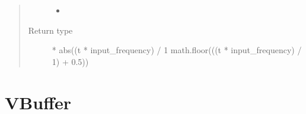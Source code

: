 \documentclass[letterpaper,10pt,english]{sphinxmanual}
\begin{document}
\begin{fulllineitems}
\begin{fulllineitems}
\begin{quote}
\begin{description}
\begin{itemize}
\item {} 
\sphinxAtStartPar
{} \textendash{} 

\end{itemize}

\item[{Return type}] \leavevmode
{} * abs((t * input\_frequency) / 1 \sphinxhyphen{} math.floor(((t * input\_frequency) / 1) + 0.5))

\end{description}\end{quote}

\end{fulllineitems}


\end{fulllineitems}


\sphinxstepscope


\section{VBuffer}
\label{\detokenize{vbuffer:module-vbuffer}}\label{\detokenize{vbuffer:vbuffer}}\label{\detokenize{vbuffer::doc}}
\end{document}
